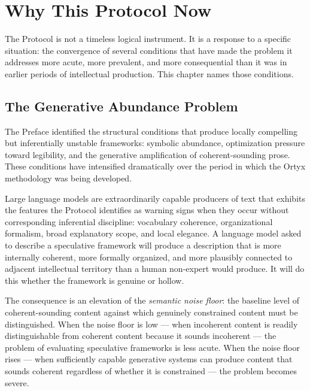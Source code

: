 
\chapter{Why This Protocol Now}
\label{ch:why-now}


\noindent
The \Ortyx{} Protocol is not a timeless logical instrument.
It is a response to a specific situation: the convergence
of several conditions that have made the problem it
addresses more acute, more prevalent, and more consequential
than it was in earlier periods of intellectual production.
This chapter names those conditions.

\section{The Generative Abundance Problem}
\label{sec:generative-abundance}

The Preface identified the structural conditions that
produce locally compelling but inferentially unstable
frameworks: symbolic abundance, optimization pressure
toward legibility, and the generative amplification
of coherent-sounding prose. These conditions have
intensified dramatically over the period in which the
Ortyx methodology was being developed.

Large language models are extraordinarily capable
producers of text that exhibits the features the
\Ortyx{} Protocol identifies as warning signs when
they occur without corresponding inferential discipline:
vocabulary coherence, organizational formalism,
broad explanatory scope, and local elegance. A language
model asked to describe a speculative framework will
produce a description that is more internally coherent,
more formally organized, and more plausibly connected
to adjacent intellectual territory than a human
non-expert would produce. It will do this whether
the framework is genuine or hollow.

The consequence is an elevation of the \emph{semantic
noise floor}: the baseline level of coherent-sounding
content against which genuinely constrained content
must be distinguished. When the noise floor is low ---
when incoherent content is readily distinguishable
from coherent content because it sounds incoherent
--- the problem of evaluating speculative frameworks
is less acute. When the noise floor rises --- when
sufficiently capable generative systems can produce
content that sounds coherent regardless of whether
it is constrained --- the problem becomes severe.

